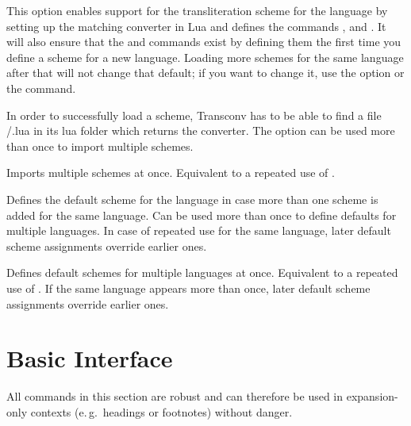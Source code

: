 \documentclass{ltxdockit}
\begin{document}
\begin{optionlist}

  This option enables support for the transliteration scheme  for
  the language  by setting up the matching converter in Lua and
  defines the commands ,
   and
  . It will also ensure that the
   and 
  commands exist by defining them the first time you define a scheme for a new
  language. Loading more schemes for the same language after that will not
  change that default; if you want to change it, use the 
  option or the  command.

  In order to successfully load a scheme, Transconv has to be able to find
  a file /.lua in its lua folder which returns the
  converter. The option can be used more than once to import multiple schemes.


  Imports multiple schemes at once. Equivalent to a repeated use of
  .


  Defines the default scheme for the language  in case more than one
  scheme is added for the same language. Can be used more than once to define
  defaults for multiple languages. In case of repeated use for the same
  language, later default scheme assignments override earlier ones.


  Defines default schemes for multiple languages at once. Equivalent to a
  repeated use of . If the same language appears more than
  once, later default scheme assignments override earlier ones.

\end{optionlist}

\section{Basic Interface}

All commands in this section are robust and can therefore be used in
expansion-only contexts (e.\,g.\ headings or footnotes) without danger.
\end{document}
